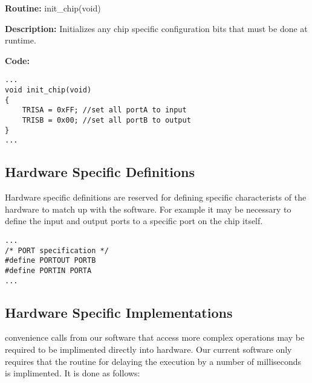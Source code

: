 \textbf{Routine:} init\_chip(void)

\textbf{Description:} Initializes any chip specific configuration bits that must be done at runtime.

\textbf{Code:}
\begin{minipage}{\textwidth}
\begin{lstlisting}[frame=single]
...
void init_chip(void)
{	
	TRISA = 0xFF; //set all portA to input
	TRISB = 0x00; //set all portB to output
}
...
\end{lstlisting}
\end{minipage}

\subsection{Hardware Specific Definitions}

Hardware specific definitions are reserved for defining specific characterists of the hardware to match up with the software. For example it may be necessary to define the input and output ports to a specific port on the chip itself.

\begin{minipage}{\textwidth}
\begin{lstlisting}[frame=single]
...
/* PORT specification */
#define PORTOUT PORTB
#define PORTIN PORTA
...
\end{lstlisting}
\end{minipage}


\subsection{Hardware Specific Implementations}

convenience calls from our software that access more complex operations may be required to be implimented directly into hardware. Our current software only requires that the routine for delaying the execution by a number of milliseconds is implimented. It is done as follows:

